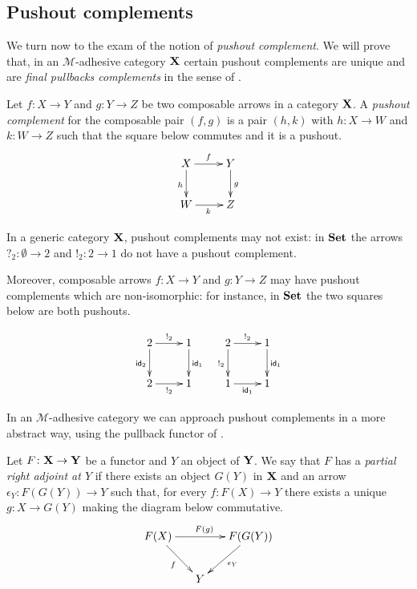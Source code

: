 \subsection{Pushout complements}

We turn now to the exam of the notion of \emph{pushout complement}. We will prove that, in an $\mathcal{M}$-adhesive category $\textbf {\textup{X}}$ certain pushout complements are unique and are \emph{final pullbacks complements} in the sense of \cite{dyckhoff1987exponentiable,corradini2006sesqui}.

\begin{definition}
Let $f\colon X\to Y$ and $g\colon Y\to Z$ be two composable arrows in a category $\textbf {\textup{X}}$. A \emph{pushout complement} for the composable pair $(f,g)$ is a pair $(h,k)$ with $h\colon X\to W$ and $k\colon W\to Z$ such that the square below commutes and it is a pushout.
\[\xymatrix{X \ar[r]^{f} \ar[d]_{h}& Y \ar[d]^{g} \\ W \ar[r]_{k}& Z}\]
\end{definition}

\begin{example}
	In a generic category $\textbf {\textup{X}}$, pushout complements may not exist: in $\textbf {\textup{Set}}$ the arrows $?_{2}\colon \emptyset \to 2$ and $!_2\colon 2\to 1$ do not have a pushout complement.
	
	Moreover, composable arrows $f\colon X\to Y$ and $g\colon Y\to Z$ may have  pushout complements which are non-isomorphic: for instance, in $\textbf {\textup{Set}}$ the two squares below are both pushouts.
	
	\[\xymatrix{2 \ar[r]^{!_2} \ar[d]_{\id{2}}& 1 \ar[d]^{\id{1}} & 2 \ar[r]^{!_2} \ar[d]_{!_2}& 1 \ar[d]^{\id{1}}\\ 2 \ar[r]_{!_2}& 1 & 1 \ar[r]_{\id{1}}& 1}\]
\end{example}


In an $\mathcal{M}$-adhesive category we can approach pushout complements in a more abstract way, using the pullback functor of .

\begin{definition}
Let $F\colon \textbf {\textup{X}} \to \textbf {\textup{Y}}$ be a functor and $Y$ an object of $\textbf {\textup{Y}}$. We say that $F$ has a \emph{partial right adjoint at $Y$} if there exists an object $G(Y)$ in $\textbf {\textup{X}}$ and an arrow $\epsilon_Y\colon F(G(Y))\to Y$ such that, for every  $f\colon F(X)\to Y$ there exists a unique $g\colon X\to G(Y)$ making the diagram below commutative.
\[\xymatrix@C=15pt{F(X) \ar[rr]^{F(g)} \ar[dr]_{f}&&F(G(Y)) \ar[dl]^{\epsilon_Y}\\ & Y}\]
\end{definition} 

